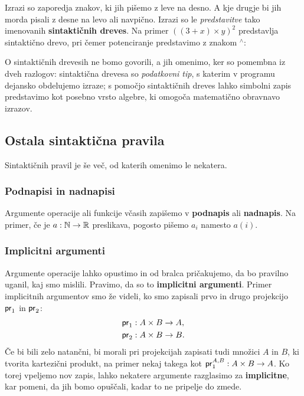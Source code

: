 Izrazi so zaporedja znakov, ki jih pišemo z leve na desno. A kje drugje bi jih morda pisali z desne na levo ali
navpično. Izrazi so le \emph{predstavitve} tako imenovanih \textbf{sintaktičnih dreves}. Na primer $((3 + x) \times y)^2$ predstavlja sintaktično drevo, pri čemer potenciranje predstavimo z znakom ${}^{\wedge}$:
%
\begin{center}
\end{center}
%
O sintaktičnih drevesih ne bomo govorili, a jih omenimo, ker so pomembna iz dveh razlogov: sintaktična drevesa so
\emph{podatkovni tip}, s katerim v programu dejansko obdelujemo izraze; s pomočjo sintaktičnih dreves lahko simbolni zapis
predstavimo kot posebno vrsto algebre, ki omogoča matematično obravnavo izrazov.


\subsection{Ostala sintaktična pravila}

Sintaktičnih pravil je še več, od katerih omenimo le nekatera.

\subsubsection{Podnapisi in nadnapisi}
\label{sec:podnapisi-nadnapisi}

Argumente operacije ali funkcije včasih zapišemo v \textbf{podnapis} ali \textbf{nadnapis}. Na primer, če je $a : \mathbb{N} \to \mathbb{R}$
preslikava, pogosto pišemo $a_i$ namesto $a(i)$.

\subsubsection{Implicitni argumenti}
\label{sec:implicitni-argumenti}

Argumente operacije lahko opustimo in od bralca pričakujemo, da bo pravilno uganil, kaj smo mislili. Pravimo, da so to
\textbf{implicitni argumenti}. Primer implicitnih argumentov smo že videli, ko smo zapisali prvo in drugo projekcijo $\mathsf{pr}_1$ in
$\mathsf{pr}_2$:
\begin{align*}
  \mathsf{pr}_1 &: A \times B \to A, \\
  \mathsf{pr}_2 &: A \times B \to B.
\end{align*}
%
Če bi bili zelo natančni, bi morali pri projekcijah zapisati tudi množici $A$ in $B$, ki tvorita kartezični produkt, na
primer nekaj takega kot $\mathsf{pr}_1^{A,B} : A \times B \to A$.
%
Ko torej vpeljemo nov zapis, lahko nekatere argumente razglasimo za \textbf{implicitne}, kar pomeni, da jih bomo opuščali,
kadar to ne pripelje do zmede.

